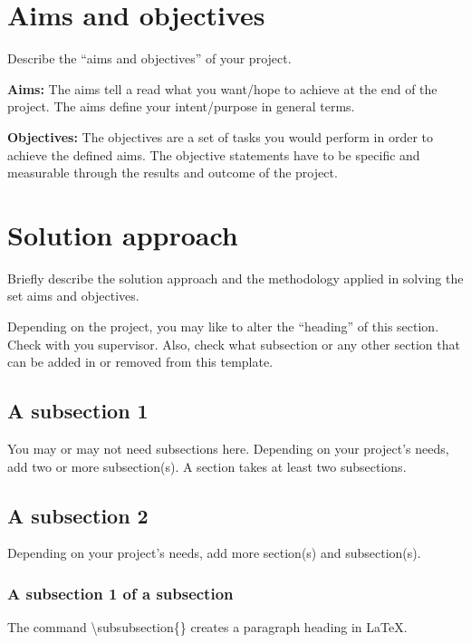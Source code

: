 \section{Aims and objectives}
\label{sec:intro_aims_obj}
Describe the ``aims and objectives'' of your project. 

\textbf{Aims:} The aims tell a read what you want/hope to achieve at the end of the project. The  aims define your intent/purpose in general terms.  

\textbf{Objectives:} The objectives are a set of tasks you would perform in order to achieve the defined aims. The objective statements have to be specific and measurable through the results and outcome of the project.



\section{Solution approach}
\label{sec:intro_sol} %
Briefly describe the solution approach and the methodology applied in solving the set aims and objectives.

Depending on the project, you may like to alter the ``heading'' of this section. Check with you supervisor. Also, check what subsection or any other section that can be added in or removed from this template.

\subsection{A subsection 1}
\label{sec:intro_some_sub1}
You may or may not need subsections here. Depending on your project's needs, add two or more subsection(s). A section takes at least two subsections. 

\subsection{A subsection 2}
\label{sec:intro_some_sub2}
Depending on your project's needs, add more section(s) and subsection(s).

\subsubsection{A subsection 1 of a subsection}
\label{sec:intro_some_subsub1}
The command \textbackslash subsubsection\{\} creates a paragraph heading in \LaTeX.

